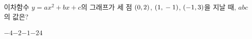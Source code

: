 이차함수 $y=ax^2+bx+c$의 그래프가 세 점 $(0{,}\mkern3mu 2)$, $(1{,}\mkern3mu -1)$, $(-1{,}\mkern3mu 3)$을 지날 때, $abc$의 값은? 
\begin{choices32}{$-4$}{$-2$}{$-1$}{$-2$}{$4$}\end{choices32}

